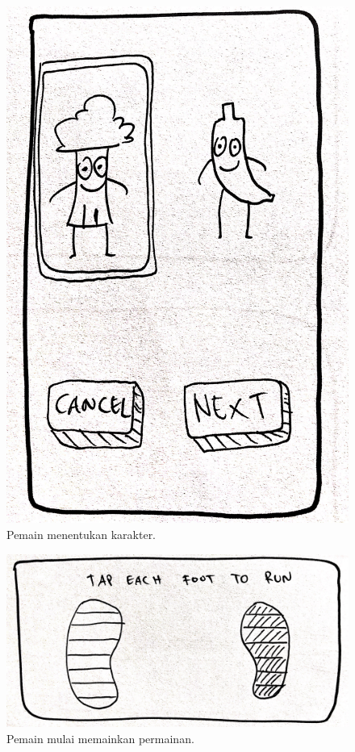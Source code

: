 \documentclass[a4paper,twoside]{article}
\begin{document}
\begin{enumerate}
		\begin{figure}[H]
			\centering
			\includegraphics[scale=0.1]{Gambar/mob4_char2}
			\caption{Pemain menentukan karakter.}
			\label{fig:13_mob4_char2}
		\end{figure}
	
		\begin{figure}[H]
			\centering
			\includegraphics[scale=0.1]{Gambar/mob5_play}
			\caption{Pemain mulai memainkan permainan.}
			\label{fig:14_mob5_play}
		\end{figure}
	

\end{enumerate}
\end{document}
